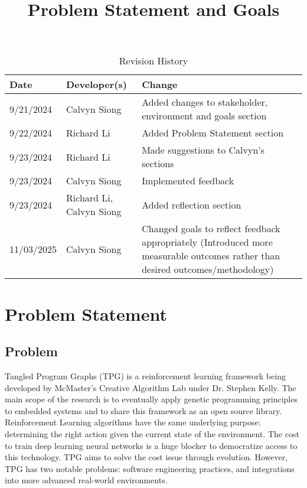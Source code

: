 \documentclass{article}
\title{Problem Statement and Goals\\\progname}
\author{\authname}
\date{}
\begin{document}
\maketitle

\begin{table}[hp]
\caption{Revision History} \label{TblRevisionHistory}
\begin{tabularx}{\textwidth}{llX}
\toprule
\textbf{Date} & \textbf{Developer(s)} & \textbf{Change}\\
\midrule
9/21/2024 & Calvyn Siong & Added changes to stakeholder, environment and goals section \\
9/22/2024 & Richard Li & Added Problem Statement section \\
9/23/2024 & Richard Li & Made suggestions to Calvyn's sections \\
9/23/2024 & Calvyn Siong & Implemented feedback \\
9/23/2024 & Richard Li, Calvyn Siong & Added reflection section \\
11/03/2025 & Calvyn Siong & Changed goals to reflect feedback appropriately (Introduced more measurable outcomes rather than desired outcomes/methodology) \\

\bottomrule
\end{tabularx}
\end{table}

\section{Problem Statement}

\subsection{Problem}

Tangled Program Graphs (TPG) is a reinforcement learning framework being developed by McMaster’s Creative Algorithm Lab under Dr. Stephen Kelly. The main scope of the research is to eventually apply genetic programming principles to embedded systems and to share this framework as an open source library. Reinforcement Learning algorithms have the same underlying purpose: determining the right action given the current state of the environment. The cost to train deep learning neural networks is a huge blocker to democratize access to this technology. TPG aims to solve the cost issue through evolution. However, TPG has two notable problems: software engineering practices, and integrations into more advanced real-world environments.
\end{document}
